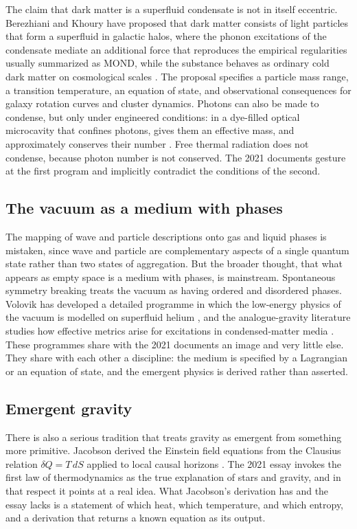 \documentclass[11pt]{article}
\begin{document}
The claim that dark matter is a superfluid condensate is not in itself eccentric. Berezhiani and Khoury have proposed that dark matter consists of light particles that form a superfluid in galactic halos, where the phonon excitations of the condensate mediate an additional force that reproduces the empirical regularities usually summarized as MOND, while the substance behaves as ordinary cold dark matter on cosmological scales \cite{berezhiani2015}. The proposal specifies a particle mass range, a transition temperature, an equation of state, and observational consequences for galaxy rotation curves and cluster dynamics. Photons can also be made to condense, but only under engineered conditions: in a dye-filled optical microcavity that confines photons, gives them an effective mass, and approximately conserves their number \cite{klaers2010}. Free thermal radiation does not condense, because photon number is not conserved. The 2021 documents gesture at the first program and implicitly contradict the conditions of the second.

\subsection{The vacuum as a medium with phases}

The mapping of wave and particle descriptions onto gas and liquid phases is mistaken, since wave and particle are complementary aspects of a single quantum state rather than two states of aggregation. But the broader thought, that what appears as empty space is a medium with phases, is mainstream. Spontaneous symmetry breaking treats the vacuum as having ordered and disordered phases. Volovik has developed a detailed programme in which the low-energy physics of the vacuum is modelled on superfluid helium \cite{volovik2003}, and the analogue-gravity literature studies how effective metrics arise for excitations in condensed-matter media \cite{barcelo2011}. These programmes share with the 2021 documents an image and very little else. They share with each other a discipline: the medium is specified by a Lagrangian or an equation of state, and the emergent physics is derived rather than asserted.

\subsection{Emergent gravity}

There is also a serious tradition that treats gravity as emergent from something more primitive. Jacobson derived the Einstein field equations from the Clausius relation $\delta Q = T\,dS$ applied to local causal horizons \cite{jacobson1995}. The 2021 essay invokes the first law of thermodynamics as the true explanation of stars and gravity, and in that respect it points at a real idea. What Jacobson's derivation has and the essay lacks is a statement of which heat, which temperature, and which entropy, and a derivation that returns a known equation as its output.
\end{document}
